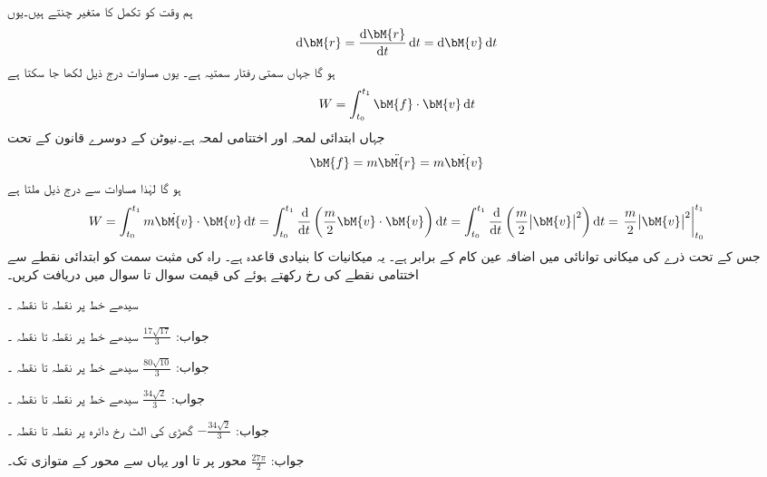 ہم وقت  کو تکمل کا متغیر چنتے ہیں۔یوں
\begin{align*}
\dif \bM{r}=\frac{\dif\bM{r}}{\dif t}\dif t=\dif \bM{v}\dif t
\end{align*} 
ہو گا جہاں  سمتی رفتار سمتیہ ہے۔ یوں مساوات  درج ذیل لکھا جا سکتا ہے
\begin{align}\label{مساوات_خطی_تکمل_کام_ب}
W=\int_{t_0}^{t_1}\bM{f}\cdot \bM{v}\dif t
\end{align}
جہاں ابتدائی لمحہ  اور اختتامی لمحہ  ہے۔نیوٹن کے دوسرے قانون کے تحت 
\begin{align}
\bM{f}=m\ddot{\bM{r}}=m\dot{\bM{v}}
\end{align}
ہو گا لہٰذا مساوات  سے درج ذیل ملتا ہے
\begin{align*}
W=\int_{t_0}^{t_1}m\dot{\bM{v}}\cdot \bM{v}\dif t=\int_{t_0}^{t_1}\frac{\dif}{\dif t}\left(\frac{m}{2}\bM{v}\cdot \bM{v}\right)\dif t=\int_{t_0}^{t_1}\frac{\dif}{\dif t}\left(\frac{m}{2}\abs{\bM{v}}^2\right)\dif t=\left.\frac{m}{2}\abs{\bM{v}}^2\right |_{t_0}^{t_1}
\end{align*}
جس  کے تحت ذرے کی میکانی توانائی میں اضافہ عین  کام کے برابر ہے۔ یہ میکانیات کا بنیادی قاعدہ ہے۔ 
راہ کی مثبت سمت کو ابتدائی نقطے سے اختتامی نقطے کی رخ رکھتے ہوئے  کی قیمت سوال  تا سوال  میں دریافت کریں۔

سیدھے خط  پر نقطہ  تا نقطہ ۔

جواب:
$\tfrac{17\sqrt{17}}{3}$
سیدھے خط  پر نقطہ  تا نقطہ ۔

جواب:
$\tfrac{80\sqrt{10}}{3}$
سیدھے خط  پر نقطہ  تا نقطہ ۔

جواب:
$\tfrac{34\sqrt{2}}{3}$
سیدھے خط  پر نقطہ  تا نقطہ ۔

جواب:
$-\tfrac{34\sqrt{2}}{3}$
گھڑی کی الٹ رخ دائرہ  پر نقطہ  تا نقطہ ۔

جواب:
$\tfrac{27\pi}{2}$
 محور پر  تا  اور یہاں سے  محور کے متوازی  تک۔

